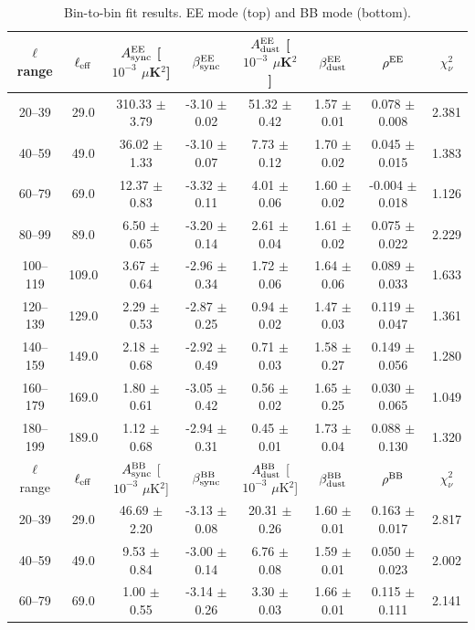 \begin{table}[htbp]
\centering
\caption{Bin-to-bin fit results. EE mode (top) and BB mode (bottom).}
\label{tab:bin_to_bin_results}
\begin{tabular}{c c c c c c c c}
\hline\hline
$\ell$ range & $\ell_{\rm eff}$ & $A^{\rm EE}_{\rm sync}$ [$10^{-3}$ $\mu$K$^2$] & $\beta^{\rm EE}_{\rm sync}$ & $A^{\rm EE}_{\rm dust}$ [$10^{-3}$ $\mu$K$^2$] & $\beta^{\rm EE}_{\rm dust}$ & $\rho^{\rm EE}$ & $\chi^2_\nu$ \\
\hline
20--39 & 29.0 & 310.33 $\pm$ 3.79 & -3.10 $\pm$ 0.02 & 51.32 $\pm$ 0.42 & 1.57 $\pm$ 0.01 & 0.078 $\pm$ 0.008 & 2.381 \\
40--59 & 49.0 & 36.02 $\pm$ 1.33 & -3.10 $\pm$ 0.07 & 7.73 $\pm$ 0.12 & 1.70 $\pm$ 0.02 & 0.045 $\pm$ 0.015 & 1.383 \\
60--79 & 69.0 & 12.37 $\pm$ 0.83 & -3.32 $\pm$ 0.11 & 4.01 $\pm$ 0.06 & 1.60 $\pm$ 0.02 & -0.004 $\pm$ 0.018 & 1.126 \\
80--99 & 89.0 & 6.50 $\pm$ 0.65 & -3.20 $\pm$ 0.14 & 2.61 $\pm$ 0.04 & 1.61 $\pm$ 0.02 & 0.075 $\pm$ 0.022 & 2.229 \\
100--119 & 109.0 & 3.67 $\pm$ 0.64 & -2.96 $\pm$ 0.34 & 1.72 $\pm$ 0.06 & 1.64 $\pm$ 0.06 & 0.089 $\pm$ 0.033 & 1.633 \\
120--139 & 129.0 & 2.29 $\pm$ 0.53 & -2.87 $\pm$ 0.25 & 0.94 $\pm$ 0.02 & 1.47 $\pm$ 0.03 & 0.119 $\pm$ 0.047 & 1.361 \\
140--159 & 149.0 & 2.18 $\pm$ 0.68 & -2.92 $\pm$ 0.49 & 0.71 $\pm$ 0.03 & 1.58 $\pm$ 0.27 & 0.149 $\pm$ 0.056 & 1.280 \\
160--179 & 169.0 & 1.80 $\pm$ 0.61 & -3.05 $\pm$ 0.42 & 0.56 $\pm$ 0.02 & 1.65 $\pm$ 0.25 & 0.030 $\pm$ 0.065 & 1.049 \\
180--199 & 189.0 & 1.12 $\pm$ 0.68 & -2.94 $\pm$ 0.31 & 0.45 $\pm$ 0.01 & 1.73 $\pm$ 0.04 & 0.088 $\pm$ 0.130 & 1.320 \\
\hline
$\ell$ range & $\ell_{\rm eff}$ & $A^{\rm BB}_{\rm sync}$ [$10^{-3}$ $\mu$K$^2$] & $\beta^{\rm BB}_{\rm sync}$ & $A^{\rm BB}_{\rm dust}$ [$10^{-3}$ $\mu$K$^2$] & $\beta^{\rm BB}_{\rm dust}$ & $\rho^{\rm BB}$ & $\chi^2_\nu$ \\
\hline
20--39 & 29.0 & 46.69 $\pm$ 2.20 & -3.13 $\pm$ 0.08 & 20.31 $\pm$ 0.26 & 1.60 $\pm$ 0.01 & 0.163 $\pm$ 0.017 & 2.817 \\
40--59 & 49.0 & 9.53 $\pm$ 0.84 & -3.00 $\pm$ 0.14 & 6.76 $\pm$ 0.08 & 1.59 $\pm$ 0.01 & 0.050 $\pm$ 0.023 & 2.002 \\
60--79 & 69.0 & 1.00 $\pm$ 0.55 & -3.14 $\pm$ 0.26 & 3.30 $\pm$ 0.03 & 1.66 $\pm$ 0.01 & 0.115 $\pm$ 0.111 & 2.141 \\

\end{tabular}
\end{table}
